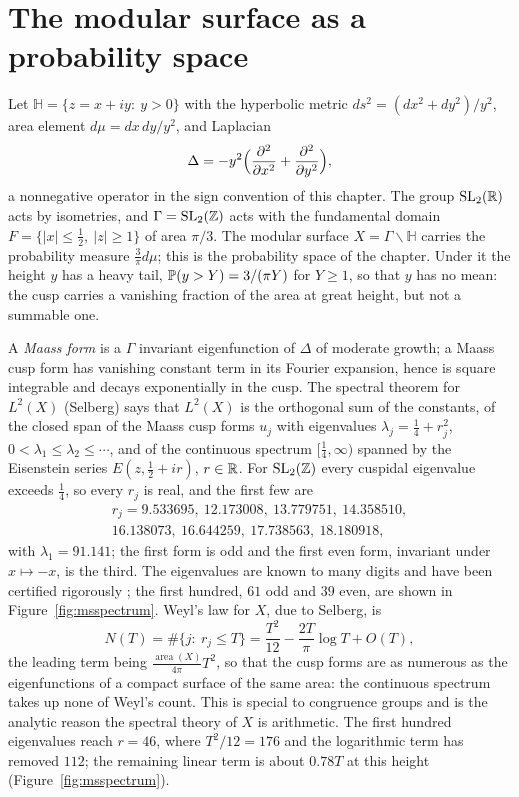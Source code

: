 \section{The modular surface as a probability space}\label{sec:mssurface}

Let $\mathbb H=\{z=x+iy:\ y>0\}$ with the hyperbolic metric $ds^2=(dx^2+dy^2)/y^2$, area element $d\mu=dx\,dy/y^2$, and Laplacian
\[
\Delta=-y^2\Bigl(\frac{\partial^2}{\partial x^2}+\frac{\partial^2}{\partial y^2}\Bigr),
\]
a nonnegative operator in the sign convention of this chapter. The group $\mathrm{SL}_2(\mathbb{R})$ acts by isometries, and $\Gamma=\mathrm{SL}_2(\mathbb{Z})$ acts with the fundamental domain $F=\{|x|\le\frac12,\ |z|\ge1\}$ of area $\pi/3$. The modular surface $X=\Gamma\backslash\mathbb H$ carries the probability measure $\frac3\pi d\mu$; this is the probability space of the chapter. Under it the height $y$ has a heavy tail, $\mathbb{P}(y>Y)=3/(\pi Y)$ for $Y\ge1$, so that $y$ has no mean: the cusp carries a vanishing fraction of the area at great height, but not a summable one.

A \emph{Maass form} is a $\Gamma$ invariant eigenfunction of $\Delta$ of moderate growth; a Maass cusp form has vanishing constant term in its Fourier expansion, hence is square integrable and decays exponentially in the cusp. The spectral theorem for $L^2(X)$ (Selberg) says that $L^2(X)$ is the orthogonal sum of the constants, of the closed span of the Maass cusp forms $u_j$ with eigenvalues $\lambda_j=\frac14+r_j^2$, $0<\lambda_1\le\lambda_2\le\cdots$, and of the continuous spectrum $[\frac14,\infty)$ spanned by the Eisenstein series $E(z,\frac12+ir)$, $r\in\mathbb{R}$. For $\mathrm{SL}_2(\mathbb{Z})$ every cuspidal eigenvalue exceeds $\frac14$, so every $r_j$ is real, and the first few are
\begin{gather*}
r_j=9.533695,\ 12.173008,\ 13.779751,\ 14.358510,\\
16.138073,\ 16.644259,\ 17.738563,\ 18.180918,
\end{gather*}
with $\lambda_1=91.141$; the first form is odd and the first even form, invariant under $x\mapsto-x$, is the third. The eigenvalues are known to many digits \cite{hejhal1992,lmfdb} and have been certified rigorously \cite{bookerstrombergssonvenkatesh2006}; the first hundred, $61$ odd and $39$ even, are shown in Figure~\ref{fig:msspectrum}. Weyl's law for $X$, due to Selberg, is
\begin{equation}\label{eq:msweyl}
N(T)=\#\{j:\ r_j\le T\}=\frac{T^2}{12}-\frac{2T}{\pi}\log T+O(T),
\end{equation}
the leading term being $\frac{\operatorname{area}(X)}{4\pi}T^2$, so that the cusp forms are as numerous as the eigenfunctions of a compact surface of the same area: the continuous spectrum takes up none of Weyl's count. This is special to congruence groups and is the analytic reason the spectral theory of $X$ is arithmetic. The first hundred eigenvalues reach $r=46$, where $T^2/12=176$ and the logarithmic term has removed $112$; the remaining linear term is about $0.78T$ at this height (Figure~\ref{fig:msspectrum}).

